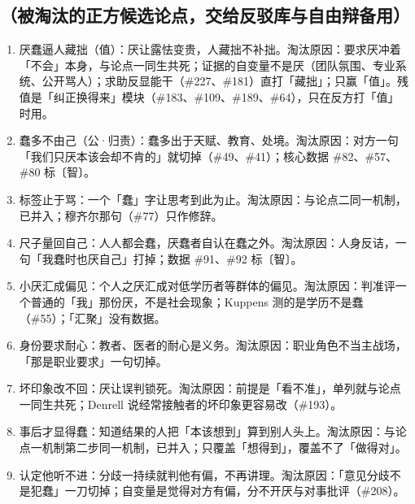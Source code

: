 \documentclass[prep,both]{debate}
\begin{document}
\begin{fields}
\end{fields}

\subsection{（被淘汰的正方候选论点，交给反驳库与自由辩备用）}
\begin{enumerate}[leftmargin=1.8em]
\item 厌蠢逼人藏拙（值）：厌让露怯变贵，人藏拙不补拙。淘汰原因：要求厌冲着「不会」本身，与论点一同生共死；证据的自变量不是厌（团队氛围、专业系统、公开骂人）；求助反显能干（\#227、\#181）直打「藏拙」；只赢「值」。残值是「纠正换得来」模块（\#183、\#109、\#189、\#64），只在反方打「值」时用。
\item 蠢多不由己（公·归责）：蠢多出于天赋、教育、处境。淘汰原因：对方一句「我们只厌本该会却不肯的」就切掉（\#49、\#41）；核心数据 \#82、\#57、\#80 标〔智〕。
\item 标签止于骂：一个「蠢」字让思考到此为止。淘汰原因：与论点二同一机制，已并入；穆齐尔那句（\#77）只作修辞。
\item 尺子量回自己：人人都会蠢，厌蠢者自认在蠢之外。淘汰原因：人身反诘，一句「我蠢时也厌自己」打掉；数据 \#91、\#92 标〔智〕。
\item 小厌汇成偏见：个人之厌汇成对低学历者等群体的偏见。淘汰原因：判准评一个普通的「我」那份厌，不是社会现象；Kuppens 测的是学历不是蠢（\#55）；「汇聚」没有数据。
\item 身份要求耐心：教者、医者的耐心是义务。淘汰原因：职业角色不当主战场，「那是职业要求」一句切掉。
\item 坏印象改不回：厌让误判锁死。淘汰原因：前提是「看不准」，单列就与论点一同生共死；Denrell 说经常接触者的坏印象更容易改（\#193）。
\item 事后才显得蠢：知道结果的人把「本该想到」算到别人头上。淘汰原因：与论点一机制第二步同一机制，已并入；只覆盖「想得到」，覆盖不了「做得对」。
\item 认定他听不进：分歧一持续就判他有偏，不再讲理。淘汰原因：「意见分歧不是犯蠢」一刀切掉；自变量是觉得对方有偏，分不开厌与对事批评（\#208）。
\end{enumerate}
\end{document}
